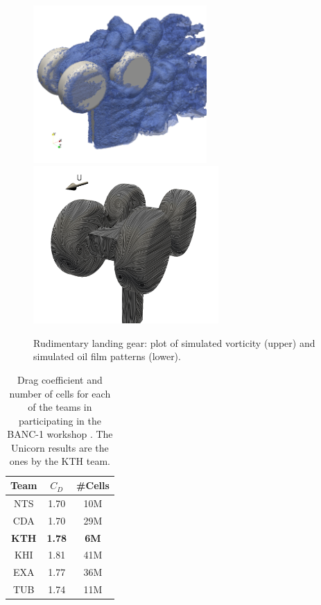 \begin{figure}
  \centering
  \includegraphics[height=6cm]{chapters/hoffman-1/png/rlg_vorticity}
  \includegraphics[height=6cm]{chapters/hoffman-1/png/oilfilm_back_sim}
  \caption{Rudimentary landing gear: plot of simulated vorticity (upper)
    and simulated oil film patterns (lower).}
  \label{hoffman-1:rlg}
\end{figure}

\begin{table}
  \center
    \begin{tabular}{|c|cc|}
      \hline
      Team & $C_D$ & \#Cells \\
      \hline
      NTS &    1.70 &    10M \\
      CDA  &   1.70  &   29M \\
      \textbf{KTH}  &   \textbf{1.78}  &   \textbf{6M}\\
      KHI  &   1.81  &   41M \\
      EXA  &   1.77  &   36M \\
      TUB  &   1.74  &   11M \\
      \hline
    \end{tabular}
    \caption{Drag coefficient and number of cells for each of the
      teams in participating in the BANC-1 workshop
      \citep{SpalartMejia2011}. The Unicorn results are the ones by
      the KTH team.}
  \label{hoffman-1:tab:hoffman-1-rlg}
\end{table}

